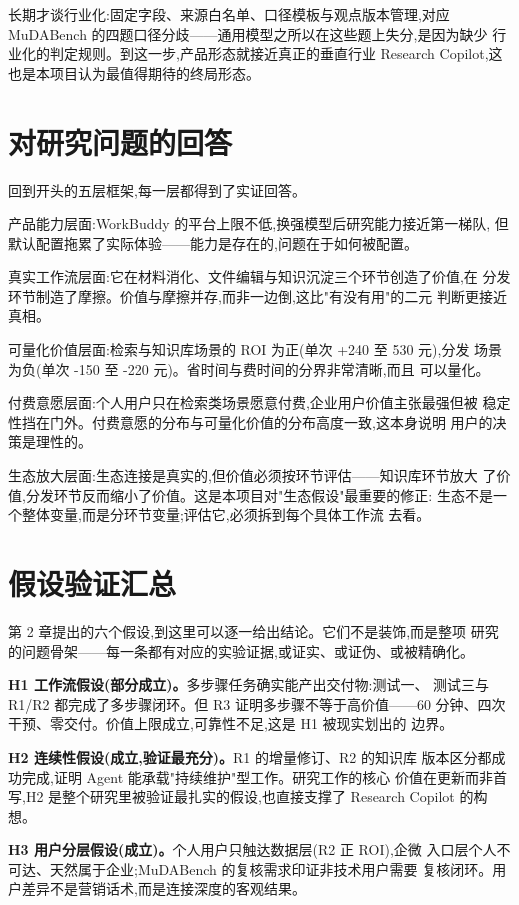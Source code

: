 \documentclass[
  12pt,
  a4paper,
  oneside,
  headings=normal,
  numbers=noendperiod,
  listof=totoc,
  bibliography=totoc
]{scrreprt}
\begin{document}
长期才谈行业化:固定字段、来源白名单、口径模板与观点版本管理,对应
MuDABench 的四题口径分歧——通用模型之所以在这些题上失分,是因为缺少
行业化的判定规则。到这一步,产品形态就接近真正的垂直行业 Research
Copilot,这也是本项目认为最值得期待的终局形态。

\section{对研究问题的回答}

回到开头的五层框架,每一层都得到了实证回答。

产品能力层面:WorkBuddy 的平台上限不低,换强模型后研究能力接近第一梯队,
但默认配置拖累了实际体验——能力是存在的,问题在于如何被配置。

真实工作流层面:它在材料消化、文件编辑与知识沉淀三个环节创造了价值,在
分发环节制造了摩擦。价值与摩擦并存,而非一边倒,这比"有没有用"的二元
判断更接近真相。

可量化价值层面:检索与知识库场景的 ROI 为正(单次 +240 至 530 元),分发
场景为负(单次 -150 至 -220 元)。省时间与费时间的分界非常清晰,而且
可以量化。

付费意愿层面:个人用户只在检索类场景愿意付费,企业用户价值主张最强但被
稳定性挡在门外。付费意愿的分布与可量化价值的分布高度一致,这本身说明
用户的决策是理性的。

生态放大层面:生态连接是真实的,但价值必须按环节评估——知识库环节放大
了价值,分发环节反而缩小了价值。这是本项目对"生态假设"最重要的修正:
生态不是一个整体变量,而是分环节变量;评估它,必须拆到每个具体工作流
去看。

\section{假设验证汇总}

第 2 章提出的六个假设,到这里可以逐一给出结论。它们不是装饰,而是整项
研究的问题骨架——每一条都有对应的实验证据,或证实、或证伪、或被精确化。

\textbf{H1 工作流假设(部分成立)。}多步骤任务确实能产出交付物:测试一、
测试三与 R1/R2 都完成了多步骤闭环。但 R3 证明多步骤不等于高价值——60
分钟、四次干预、零交付。价值上限成立,可靠性不足,这是 H1 被现实划出的
边界。

\textbf{H2 连续性假设(成立,验证最充分)。}R1 的增量修订、R2 的知识库
版本区分都成功完成,证明 Agent 能承载"持续维护"型工作。研究工作的核心
价值在更新而非首写,H2 是整个研究里被验证最扎实的假设,也直接支撑了
Research Copilot 的构想。

\textbf{H3 用户分层假设(成立)。}个人用户只触达数据层(R2 正 ROI),企微
入口层个人不可达、天然属于企业;MuDABench 的复核需求印证非技术用户需要
复核闭环。用户差异不是营销话术,而是连接深度的客观结果。
\end{document}
